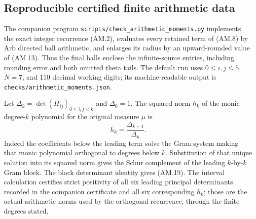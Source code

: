 \subsection{Reproducible certified finite arithmetic data}

The companion program \texttt{scripts/check\_arithmetic\_moments.py}
implements the exact integer recurrence (AM.2), evaluates every
retained term of (AM.8) by Arb directed ball arithmetic, and
enlarges its radius by an upward-rounded value of (AM.13).
Thus the final balls enclose the infinite-source entries, including
rounding error and both omitted theta tails.  The default run
uses \(0\leq i,j\leq5\), \(N=7\), and \(110\) decimal working
digits; its machine-readable output is
\texttt{checks/arithmetic\_moments.json}.

Let \(\Delta_k=\det(H_{ij})_{0\leq i,j<k}\) and
\(\Delta_0=1\).  The squared norm \(h_k\) of the monic
degree-\(k\) polynomial for the original measure \(\mu\) is
\[
 h_k=\frac{\Delta_{k+1}}{\Delta_k}.
 \tag{AM.19}
\]
Indeed the coefficients below the leading term solve the Gram
system making that monic polynomial orthogonal to degrees below
\(k\).  Substitution of that unique solution into its squared
norm gives the Schur complement of the leading \(k\)-by-\(k\)
Gram block.  The block determinant identity gives (AM.19).
The interval calculation certifies strict positivity of all six
leading principal determinants recorded in the companion certificate
and all six corresponding
\(h_k\); those are the actual arithmetic norms used by the
orthogonal recurrence, through the finite degrees stated.

